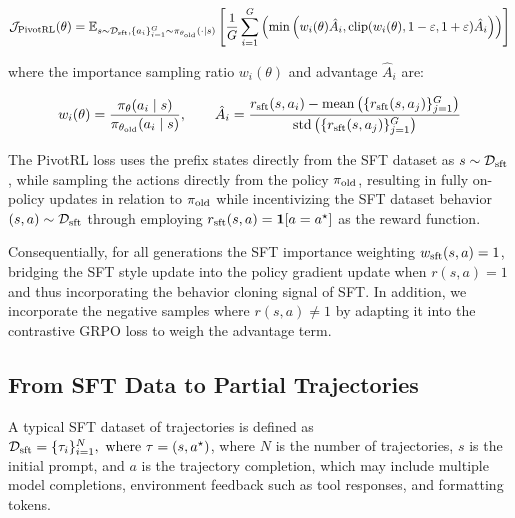 \begin{equation}
\mathcal{J}_{\text{PivotRL}}(\theta) = \mathbb{E}_{s \sim \mathcal{D}_{\mathrm{sft}}, \{a_i\}_{i=1}^G \sim \pi_{\theta_{\text{old}}}(\cdot \mid s)} \left[ \frac{1}{G} \sum_{i=1}^G \left( \min \left( w_i(\theta) \hat{A}_i, \text{clip}(w_i(\theta), 1-\varepsilon, 1+\varepsilon) \hat{A}_i \right) \right) \right]
\label{eq:pivotrl_loss}
\end{equation}

\noindent where the importance sampling ratio $w_i(\theta)$ and advantage $\hat{A}_i$ are:

\begin{equation}
w_i(\theta) = \frac{\pi_\theta(a_i \mid s)}{\pi_{\theta_{\text{old}}}(a_i \mid s)}, \qquad \hat{A}_i = \frac{r_{\mathrm{sft}}(s, a_i) - \text{mean}\left(\{r_{\mathrm{sft}}(s, a_j)\}_{j=1}^G\right)}{\text{std}\left(\{r_{\mathrm{sft}}(s, a_j)\}_{j=1}^G\right)}
\label{eq:pivot_definitions}
\end{equation}

The PivotRL loss uses the prefix states directly from the SFT dataset as $s \sim \mathcal{D}_{\mathrm{sft}}$, while sampling the actions directly from the policy $\pi_{\mathrm{old}}$, resulting in fully on-policy updates in relation to $\pi_{\mathrm{old}}$ while incentivizing the SFT dataset behavior $(s, a) \sim \mathcal{D}_{\mathrm{sft}}$ through employing $r_{\mathrm{sft}}(s, a) = \mathbf{1}[a =a^\star]$ as the reward function. 

Consequentially, for all generations the SFT importance weighting $w_{\mathrm{sft}}(s,a) = 1$, bridging the SFT style update into the policy gradient update when $r(s, a) = 1$ and thus incorporating the behavior cloning signal of SFT. In addition, we incorporate the negative samples where $r(s, a) \not= 1$ by adapting it into the contrastive GRPO loss to weigh the advantage term.



\subsection{From SFT Data to Partial Trajectories}

A typical SFT dataset of trajectories is defined as $\mathcal{D}_{\mathrm{sft}} = \{ \tau_i \}_{i=1}^N, \text { where } \tau = (s, a^\star)$, where $N$ is the number of trajectories, $s$ is the initial prompt, and $a$ is the trajectory completion, which may include multiple model completions, environment feedback such as tool responses, and formatting tokens. 

